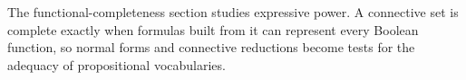 \begin{remark*}[Exposition]
The functional-completeness section studies expressive power. A connective
set is complete exactly when formulas built from it can represent every
Boolean function, so normal forms and connective reductions become tests for
the adequacy of propositional vocabularies.
\end{remark*}
